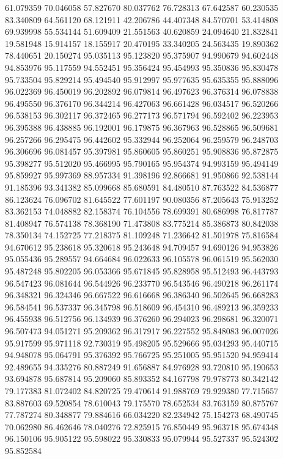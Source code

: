 61.079359
70.046058
57.827670
80.037762
76.728313
67.642587
60.230535
83.340809
64.561120
68.121911
42.206786
44.407348
84.570701
53.414808
69.939998
55.534144
51.609409
21.551563
40.620859
24.094640
21.832841
19.581948
15.914157
18.155917
20.470195
33.340205
24.563435
19.890362
78.440651
20.150274
95.035113
95.123820
95.375907
94.990679
94.602448
94.853976
95.117559
94.552451
95.356424
95.454993
95.350836
95.830478
95.733504
95.829214
95.494540
95.912997
95.977635
95.635355
95.888096
96.022369
96.450019
96.202892
96.079814
96.497623
96.376314
96.078838
96.495550
96.376170
96.344214
96.427063
96.661428
96.034517
96.520266
96.538153
96.302117
96.372465
96.277173
96.571794
96.592402
96.223953
96.395388
96.438885
96.192001
96.179875
96.367963
96.528865
96.509681
96.257266
96.295475
96.442602
95.332944
96.252064
96.259579
96.248703
96.306696
96.081457
95.397981
95.860605
95.860251
95.908836
95.872875
95.398277
95.512020
95.466995
95.790165
95.954374
94.993159
95.494149
95.859927
95.997369
88.957334
91.398196
92.866681
91.950866
92.538144
91.185396
93.341382
85.099668
85.680591
84.480510
87.763522
84.536877
86.123624
76.096702
81.645522
77.601197
90.080356
87.205643
75.913252
83.362153
74.048882
82.158374
76.104556
78.699391
80.686998
76.817787
81.408947
76.574138
78.368190
71.473808
83.775214
85.386873
80.842038
78.350134
74.152725
77.218375
81.109248
71.236642
81.501978
75.816584
94.670612
95.238618
95.320618
95.243648
94.709457
94.690126
94.953826
95.055436
95.289557
94.664684
96.022633
96.105578
96.061519
95.562030
95.487248
95.802205
96.053366
95.671845
95.828958
95.512493
96.443793
96.547423
96.081644
96.544926
96.233770
96.543546
96.490218
96.261174
96.348321
96.324346
96.667522
96.616668
96.386340
96.502645
96.668283
96.584541
96.537337
96.345798
96.518609
96.454310
96.489213
96.359233
96.455938
96.512756
96.134939
96.376260
96.294023
96.298681
96.320071
96.507473
94.051271
95.209362
96.317917
96.227552
95.848083
96.007026
95.917599
95.971118
92.730319
95.498205
95.529666
95.034293
95.440715
94.948078
95.064791
95.376392
95.766725
95.251005
95.951520
94.959414
92.489655
94.335276
80.887249
91.656887
84.976928
93.720810
95.190653
93.694878
95.687814
95.209060
85.893352
84.167798
79.978773
80.342142
79.177383
81.072402
84.820725
79.470614
91.988769
79.929380
77.715657
83.887603
69.520854
78.610043
79.175570
78.652534
83.763159
80.875767
77.787274
80.348877
79.884616
66.034220
82.234942
75.154273
68.490745
70.062980
86.462646
78.040276
72.825915
76.850449
95.963718
95.674348
96.150106
95.905122
95.598022
95.330833
95.079944
95.527337
95.524302
95.852584
